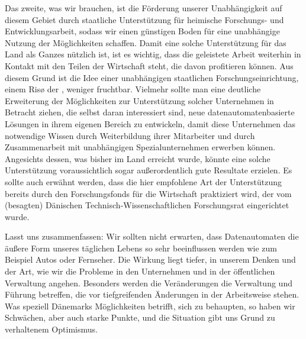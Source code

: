 {Das zweite, was wir brauchen, ist die Förderung unserer Unabhängigkeit auf diesem Gebiet durch staatliche Unterstützung für heimische Forschungs- und Entwicklungsarbeit, sodass wir einen günstigen Boden für eine unabhängige Nutzung der Möglichkeiten schaffen. Damit eine solche Unterstützung für das Land als Ganzes nützlich ist, ist es wichtig, dass die geleistete Arbeit weiterhin in Kontakt mit den Teilen der Wirtschaft steht, die davon profitieren können. Aus diesem Grund ist die Idee einer unabhängigen staatlichen Forschungseinrichtung, einem Risø der , weniger fruchtbar. Vielmehr sollte man eine deutliche Erweiterung der Möglichkeiten zur Unterstützung solcher Unternehmen in Betracht ziehen, die selbst daran interessiert sind, neue datenautomatenbasierte Lösungen in ihrem eigenen Bereich zu entwickeln, damit diese Unternehmen das notwendige Wissen durch Weiterbildung ihrer Mitarbeiter und durch Zusammenarbeit mit unabhängigen  Spezialunternehmen erwerben können. Angesichts dessen, was bisher im Land erreicht wurde, könnte eine solche Unterstützung voraussichtlich sogar außerordentlich gute Resultate erzielen. Es sollte auch erwähnt werden, dass die hier empfohlene Art der Unterstützung bereits durch den Forschungsfonds für die Wirtschaft praktiziert wird, der vom (besagten) Dänischen Technisch-Wissenschaftlichen Forschungsrat eingerichtet wurde.

Lasst uns zusammenfassen: Wir sollten nicht erwarten, dass Datenautomaten die äußere Form unseres täglichen Lebens so sehr beeinflussen werden wie zum Beispiel Autos oder Fernseher. Die Wirkung liegt tiefer, in unserem Denken und der Art, wie wir die Probleme in den Unternehmen und in der öffentlichen Verwaltung angehen. Besonders werden die Veränderungen die Verwaltung und Führung betreffen, die vor tiefgreifenden Änderungen in der Arbeitsweise stehen. Was speziell Dänemarks Möglichkeiten betrifft, sich zu behaupten, so haben wir Schwächen, aber auch starke Punkte, und die Situation gibt uns Grund zu verhaltenem Optimismus.
}